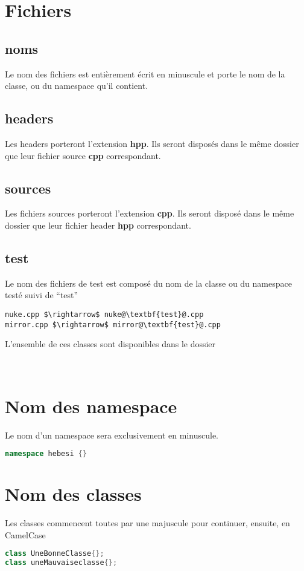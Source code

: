 \documentclass[a4paper,11pt]{report}
\begin{document}
\section{Fichiers}
\subsection{noms}
Le nom des fichiers est entièrement écrit en minuscule et porte le nom de la
classe, ou du namespace qu'il contient.
\subsection{headers}
Les headers porteront l'extension \textbf{hpp}. Ils seront disposés dans le même
dossier que leur fichier source \textbf{cpp} correspondant.
\subsection{sources}
Les fichiers sources porteront l'extension \textbf{cpp}. Ils seront disposé dans
le même dossier que leur fichier header \textbf{hpp} correspondant.
\subsection{test}
Le nom des fichiers de test est composé du nom de la classe ou du namespace
testé suivi de ``test''
\begin{lstlisting}[frame=single, mathescape, escapechar=@]
nuke.cpp $\rightarrow$ nuke@\textbf{test}@.cpp 
mirror.cpp $\rightarrow$ mirror@\textbf{test}@.cpp
\end{lstlisting}
L'ensemble de ces classes sont disponibles dans le dossier
\begin{center}
 \\
\end{center}

\section{Nom des namespace}
Le nom d'un namespace sera exclusivement en minuscule.
\begin{lstlisting}[frame=single, language=C++]
namespace hebesi {}
\end{lstlisting}
\section{Nom des classes}
Les classes commencent toutes par une majuscule pour continuer, ensuite, en
CamelCase
\begin{lstlisting}[frame=single,language=C++]
class UneBonneClasse{};
class uneMauvaiseclasse{};
\end{lstlisting}
\end{document}
